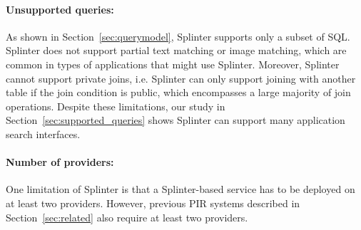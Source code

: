 
%


\paragraph{Unsupported queries:}
As shown in Section~\ref{sec:querymodel}, Splinter supports only a subset of SQL.
Splinter does not support partial text matching or image matching, which are common in types of applications
that might use Splinter. Moreover, Splinter cannot support private joins, i.e. Splinter can only support joining with 
another table if the join condition is public, which encompasses a large majority of join operations. 
Despite these limitations, our study in Section~\ref{sec:supported_queries} 
shows Splinter can support many application search interfaces.

\paragraph{Number of providers:} 
One limitation of Splinter is that 
a Splinter-based service has 
to be deployed on at least two providers. 
However, previous PIR systems described in Section~\ref{sec:related}
also require at least two providers. 

